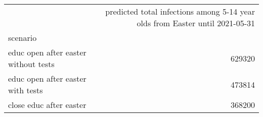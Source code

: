 \begin{tabular}{lr}
\toprule
{} &  predicted total infections among 5-14 year olds from Easter until 2021-05-31 \\
scenario                               &                                                                               \\
\midrule
 educ open after easter  without tests &                                             629320 \\
 educ open after easter  with tests    &                                             473814 \\
 close educ after easter               &                                             368200 \\
\bottomrule
\end{tabular}
